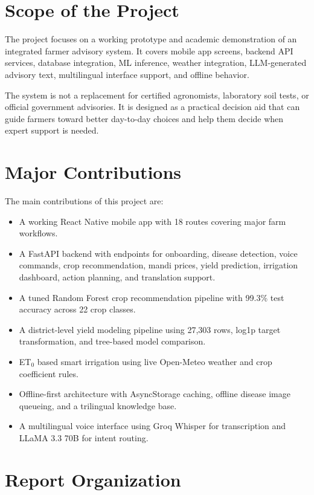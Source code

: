 \documentclass[12pt,a4paper]{report}
\begin{document}
\section{Scope of the Project}

The project focuses on a working prototype and academic demonstration of an integrated farmer advisory system. It covers mobile app screens, backend API services, database integration, ML inference, weather integration, LLM-generated advisory text, multilingual interface support, and offline behavior.

The system is not a replacement for certified agronomists, laboratory soil tests, or official government advisories. It is designed as a practical decision aid that can guide farmers toward better day-to-day choices and help them decide when expert support is needed.

\section{Major Contributions}

The main contributions of this project are:

\begin{itemize}[leftmargin=1.5em]
  \item A working React Native mobile app with 18 routes covering major farm workflows.
  \item A FastAPI backend with endpoints for onboarding, disease detection, voice commands, crop recommendation, mandi prices, yield prediction, irrigation dashboard, action planning, and translation support.
  \item A tuned Random Forest crop recommendation pipeline with 99.3\% test accuracy across 22 crop classes.
  \item A district-level yield modeling pipeline using 27,303 rows, log1p target transformation, and tree-based model comparison.
  \item ET$_0$ based smart irrigation using live Open-Meteo weather and crop coefficient rules.
  \item Offline-first architecture with AsyncStorage caching, offline disease image queueing, and a trilingual knowledge base.
  \item A multilingual voice interface using Groq Whisper for transcription and LLaMA 3.3 70B for intent routing.
\end{itemize}

\section{Report Organization}
\end{document}
